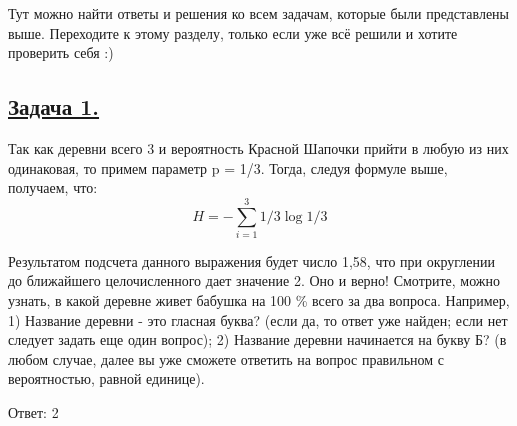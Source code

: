 Тут можно найти ответы и решения ко всем задачам, которые были представлены выше. Переходите к этому разделу, только если уже всё решили и хотите проверить себя :)

\subsection*{\hyperref[sec:problem1]{Задача 1.}}
\label{sec:sol_problem1}
Так как деревни всего 3 и вероятность Красной Шапочки прийти в любую из них одинаковая, то примем параметр p = 1/3. Тогда, следуя формуле выше, получаем, что:
\[H=-\sum\limits_{i=1}^3 1/3\log 1/3 \]

Результатом подсчета данного выражения будет число 1,58, что при округлении до ближайшего целочисленного дает значение 2. Оно и верно! Смотрите, можно узнать, в какой деревне живет бабушка на 100 \%  всего за два вопроса. 
Например, 1) Название деревни - это гласная буква? (если да, то ответ уже найден; если нет следует задать еще один вопрос); 2) Название деревни начинается на букву Б? (в любом случае, далее вы уже сможете ответить на вопрос правильном с вероятностью, равной единице).

Ответ: 2
